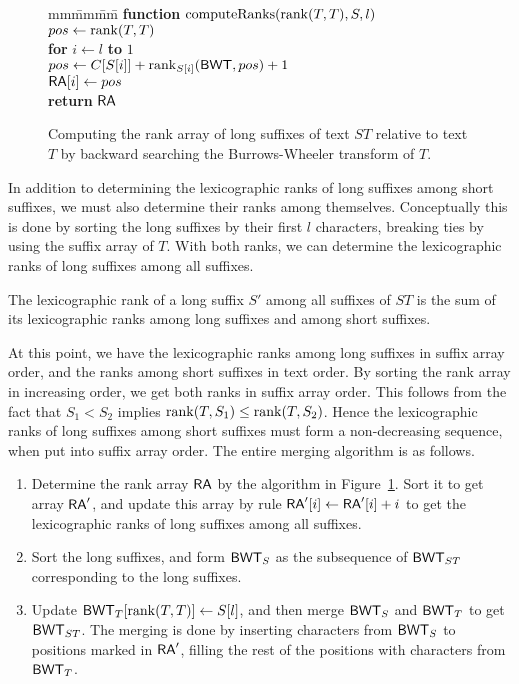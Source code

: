 \begin{figure}
\begin{tabbing}
mm\=mm\=mm\= \kill
\> \textbf{function} $\operatorname{computeRanks}(\operatorname{rank}(T,T), S, l)$ \\
\> \> $pos \leftarrow \operatorname{rank}(T, T)$ \\
\> \> \textbf{for} $i \leftarrow l$ \textbf{to} $1$ \\
\> \> \> $pos \leftarrow C[S[i]] + \operatorname{rank}_{S[i]}(\mathsf{BWT}, pos) + 1$ \\
\> \> \> $\mathsf{RA}[i] \leftarrow pos$ \\
\> \> \textbf{return} $\mathsf{RA}$
\end{tabbing}

\caption{Computing the rank array of long suffixes of text $ST$ relative to text $T$ by backward searching the Burrows-Wheeler transform of $T$.}\label{fig:rank array}
\end{figure}

In addition to determining the lexicographic ranks of long suffixes among short suffixes, we must also determine their ranks among themselves. Conceptually this is done by sorting the long suffixes by their first $l$ characters, breaking ties by using the suffix array of $T$. With both ranks, we can determine the lexicographic ranks of long suffixes among all suffixes.

\begin{lemma}
The lexicographic rank of a long suffix $S'$ among all suffixes of $ST$ is the sum of its lexicographic ranks among long suffixes and among short suffixes.
\end{lemma}

At this point, we have the lexicographic ranks among long suffixes in suffix array order, and the ranks among short suffixes in text order. By sorting the rank array in increasing order, we get both ranks in suffix array order. This follows from the fact that $S_{1} < S_{2}$ implies $\operatorname{rank}(T, S_{1}) \le \operatorname{rank}(T, S_{2})$. Hence the lexicographic ranks of long suffixes among short suffixes must form a non-decreasing sequence, when put into suffix array order. The entire merging algorithm is as follows.

\begin{enumerate}

\item Determine the rank array $\mathsf{RA}$ by the algorithm in Figure~\ref{fig:rank array}. Sort it to get array $\mathsf{RA}'$, and update this array by rule $\mathsf{RA}'[i] \leftarrow \mathsf{RA}'[i] + i$ to get the lexicographic ranks of long suffixes among all suffixes.

\item Sort the long suffixes, and form $\mathsf{BWT}_{S}$ as the subsequence of $\mathsf{BWT}_{ST}$ corresponding to the long suffixes.

\item Update $\mathsf{BWT}_{T}[\operatorname{rank}(T, T)] \leftarrow S[l]$, and then merge $\mathsf{BWT}_{S}$ and $\mathsf{BWT}_{T}$ to get $\mathsf{BWT}_{ST}$. The merging is done by inserting characters from $\mathsf{BWT}_{S}$ to positions marked in $\mathsf{RA}'$, filling the rest of the positions with characters from $\mathsf{BWT}_{T}$.

\end{enumerate}

